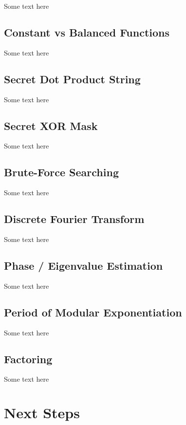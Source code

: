 \documentclass{article}
\begin{document}
Some text here

\subsection{Constant vs Balanced Functions}

Some text here

\subsection{Secret Dot Product String}

Some text here

\subsection{Secret XOR Mask}

Some text here

\subsection{Brute-Force Searching}

Some text here

\subsection{Discrete Fourier Transform}

Some text here

\subsection{Phase / Eigenvalue Estimation}

Some text here

\subsection{Period of Modular Exponentiation}

Some text here

\subsection{Factoring}

Some text here

\section{Next Steps} %
\end{document}
